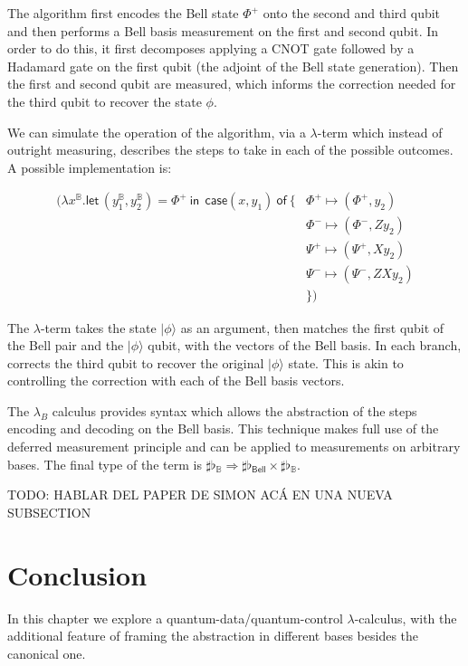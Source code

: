 \documentclass[runningheads,orivec,envcountsame,envcountsect]{llncs}
\newcommand\ket[1]{\ensuremath{|#1\rangle}}
\def\Pair#1#2{(#1,#2)} %
\def\Lam#1#2#3{\lambda#1^{#2}{.}#3} %
\def\letkeyword{\mathsf{let}}
\def\inkeyword{\mathsf{in}}
\def\LetP#1#2#3#4#5#6{\letkeyword\,\Pair{#1^{#2}}{#3^{#4}}=#5~\inkeyword~#6}
\def\Arr{\Rightarrow}
\newcommand\B{\mathbb B}
\newcommand{\Bell}{\mathsf{Bell}}
\newcommand{\lambdaB}{\lambda_B}
\newcommand\basis[1]{\ensuremath{\flat_{#1}}}
\begin{document}
The algorithm first encodes the Bell state $\Phi^+$ onto the second and third qubit and then performs a Bell basis measurement on the first and second qubit. In order to do this, it first decomposes applying a CNOT gate followed by a Hadamard gate on the first qubit (the adjoint of the Bell state generation). Then the first and second qubit are measured, which informs the correction needed for the third qubit to recover the state $\phi$.

We can simulate the operation of the algorithm, via a $\lambda$-term which instead of outright measuring, describes the steps to take in each of the possible outcomes. A possible implementation is:

\begin{align*}
    (\Lam{x}{\B}{\LetP{y_1}{\B}{y_2}{\B}{\Phi^+}{ ~\mathsf{case } \Pair{x}{y_1}  ~\mathsf{ of }~\{ &\Phi^+\mapsto \Pair{\Phi^+}{y_2}\\
    &\Phi^-\mapsto \Pair{\Phi^-}{Z y_2}\\
    &\Psi^+\mapsto \Pair{\Psi^+}{X y_2}\\
    &\Psi^-\mapsto \Pair{\Psi^-}{ZX y_2}\\
    &\}}})
\end{align*}

The $\lambda$-term takes the state $\ket{\phi}$ as an argument, then matches the first qubit of the Bell pair and the $\ket{\phi}$ qubit, with the vectors of the Bell basis. In each branch, corrects the third qubit to recover the original $\ket{\phi}$ state. This is akin to controlling the correction with each of the Bell basis vectors.

The $\lambdaB$ calculus provides syntax which allows the abstraction of the steps encoding and decoding on the Bell basis. This technique makes full use of the deferred measurement principle and can be applied to measurements on arbitrary bases. The final type of the term is $\sharp\basis{\B}\Arr \sharp\basis{\Bell}\times \sharp\basis{\B}$.

{\color{red} TODO: HABLAR DEL PAPER DE SIMON ACÁ EN UNA NUEVA SUBSECTION}

\section{Conclusion}\label{sec:conclusion}

In this chapter we explore a quantum-data/quantum-control $\lambda$-calculus, with the additional feature of framing the abstraction in different bases besides the canonical one.
\end{document}
